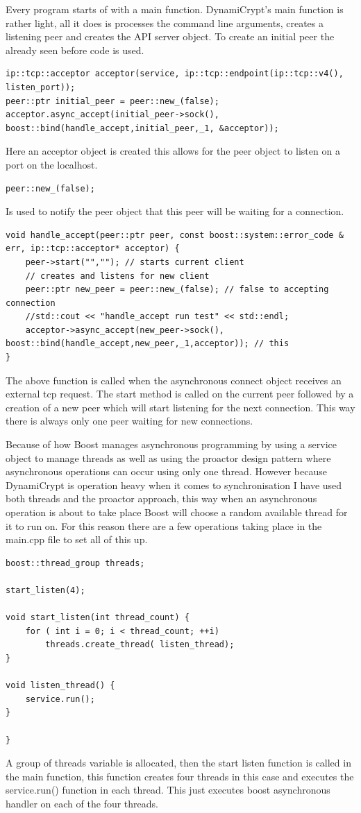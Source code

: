 Every program starts of with a main function. DynamiCrypt's main function is rather light, all it does is processes the command line arguments, creates a listening peer and creates the API server object.
To create an initial peer the already seen before code is used.
\begin{lstlisting}
ip::tcp::acceptor acceptor(service, ip::tcp::endpoint(ip::tcp::v4(), listen_port));
peer::ptr initial_peer = peer::new_(false);
acceptor.async_accept(initial_peer->sock(), boost::bind(handle_accept,initial_peer,_1, &acceptor));
\end{lstlisting}
Here an acceptor object is created this allows for the peer object to listen on a port on the localhost.
\begin{lstlisting}
peer::new_(false);
\end{lstlisting}
Is used to notify the peer object that this peer will be waiting for a connection.
\begin{lstlisting}
void handle_accept(peer::ptr peer, const boost::system::error_code & err, ip::tcp::acceptor* acceptor) {
    peer->start("",""); // starts current client
    // creates and listens for new client
    peer::ptr new_peer = peer::new_(false); // false to accepting connection
    //std::cout << "handle_accept run test" << std::endl;
    acceptor->async_accept(new_peer->sock(), boost::bind(handle_accept,new_peer,_1,acceptor)); // this 
}
\end{lstlisting}
The above function is called when the asynchronous connect object receives an external tcp request. The start method is called on the current peer followed by a creation of a new peer which will start listening for the next connection. This way there is always only one peer waiting for new connections. 

Because of how Boost manages asynchronous programming by using a service object to manage threads as well as using the proactor design pattern where asynchronous operations can occur using only one thread. However because DynamiCrypt is operation heavy when it comes to synchronisation I have used both threads and the proactor approach, this way when an asynchronous operation is about to take place Boost will choose a random available thread for it to run on. 
For this reason there are a few operations taking place in the main.cpp file to set all of this up.
\begin{lstlisting}
boost::thread_group threads;

start_listen(4);

void start_listen(int thread_count) {
    for ( int i = 0; i < thread_count; ++i)
        threads.create_thread( listen_thread);
}

void listen_thread() {
    service.run();
}

}
\end{lstlisting}
A group of threads variable is allocated, then the start listen function is called in the main function, this function creates four threads in this case and executes the service.run() function in each thread. This just executes boost asynchronous handler on each of the four threads. 


